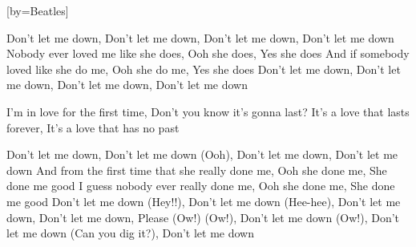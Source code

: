 

[by=Beatles]

\begin{LARGE}


\beginchorus
Don't let me down, Don't let me down,
Don't let me down, Don't let me down
Nobody ever loved me like she does,
Ooh she does, Yes she does
And if somebody loved like she do me,
Ooh she do me, Yes she does
Don't let me down, Don't let me down,
Don't let me down, Don't let me down
\endchorus

\beginverse
I'm in love for the first time, Don't you know it's gonna last?
It's a love that lasts forever, It's a love that has no past
\endverse

\beginchorus
Don't let me down, Don't let me down (Ooh),
Don't let me down, Don't let me down
And from the first time that she really done me,
Ooh she done me, She done me good
I guess nobody ever really done me,
Ooh she done me, She done me good
Don't let me down (Hey!!), Don't let me down (Hee-hee),
Don't let me down, Don't let me down, Please (Ow!)
(Ow!), Don't let me down (Ow!), Don't let me down
(Can you dig it?), Don't let me down
\endchorus


\end{LARGE}



\chordson
\endsong

